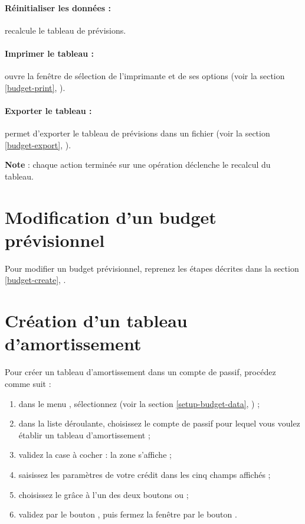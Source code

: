 \paragraph{Réinitialiser les données :}recalcule le tableau de prévisions.

\paragraph{Imprimer le tableau :}ouvre la fenêtre de sélection de l'imprimante et de ses options (voir la section \ref{budget-print}, ).

\paragraph{Exporter le tableau :}permet d'exporter le tableau de prévisions dans un fichier (voir la section \vref{budget-export}, ).

\textbf{Note} : chaque action terminée sur une opération déclenche le recalcul du tableau. 


\section{Modification d'un budget prévisionnel\label{budget-modify}}


Pour modifier un budget prévisionnel, reprenez les étapes décrites dans la section \vref{budget-create}, . 


\section{Création d'un tableau d'amortissement\label{budget-amortizationCreate}}


Pour créer un tableau d'amortissement dans un compte de passif, procédez comme suit :

\begin{enumerate}
	\item dans le menu , sélectionnez  (voir la section \vref{setup-budget-data}, ) ;
	\item dans la liste déroulante, choisissez le compte de passif pour lequel vous voulez établir un tableau d'amortissement ;
	\item validez la case à cocher  : la zone  s'affiche ;
	\item saisissez les paramètres de votre crédit dans les cinq champs affichés ;
	\item choisissez le  grâce à l'un des deux boutons  ou  ;
	\item validez par le bouton , puis fermez la fenêtre par le bouton .
\end{enumerate}

